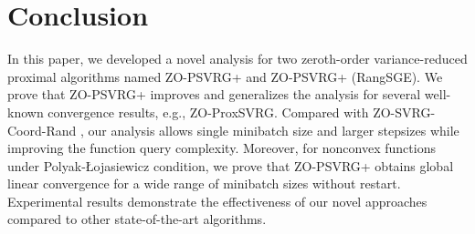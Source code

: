 \section{Conclusion}
In this paper, we developed a novel analysis for two zeroth-order variance-reduced proximal algorithms named 
ZO-PSVRG+ and ZO-PSVRG+ (RangSGE). We prove that ZO-PSVRG+ improves and generalizes the analysis for several well-known convergence
results, e.g., ZO-ProxSVRG. Compared with ZO-SVRG-Coord-Rand  \cite{ji2019improved}, our analysis allows single minibatch size and larger
stepsizes while improving the function query complexity. Moreover, for nonconvex functions under Polyak-Łojasiewicz condition, we prove that ZO-PSVRG+
obtains global linear convergence for a wide range of minibatch sizes without restart. Experimental results demonstrate the effectiveness of our novel approaches compared to other state-of-the-art algorithms.